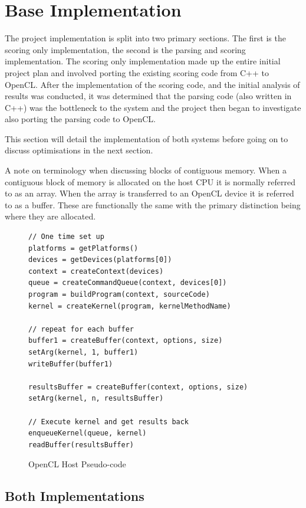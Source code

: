 \section{Base Implementation}

The project implementation is split into two primary sections. The first is the
scoring only implementation, the second is the parsing and scoring
implementation. The scoring only implementation made up the entire initial
project plan and involved porting the existing scoring code from C++ to OpenCL.
After the implementation of the scoring code, and the initial analysis of
results was conducted, it was determined that the parsing code (also written in
C++) was the bottleneck to the system and the project then began to investigate
also porting the parsing code to OpenCL.

This section will detail the implementation of both systems before going on to
discuss optimisations in the next section.

A note on terminology when discussing blocks of contiguous memory. When a
contiguous block of memory is allocated on the host CPU it is normally referred
to as an array. When the array is transferred to an OpenCL device it is referred
to as a buffer. These are functionally the same with the primary distinction
being where they are allocated.

\begin{figure}[H]
\small\begin{verbatim}
// One time set up
platforms = getPlatforms()
devices = getDevices(platforms[0])
context = createContext(devices)
queue = createCommandQueue(context, devices[0])
program = buildProgram(context, sourceCode)
kernel = createKernel(program, kernelMethodName)

// repeat for each buffer
buffer1 = createBuffer(context, options, size)
setArg(kernel, 1, buffer1)
writeBuffer(buffer1)

resultsBuffer = createBuffer(context, options, size)
setArg(kernel, n, resultsBuffer)

// Execute kernel and get results back
enqueueKernel(queue, kernel)
readBuffer(resultsBuffer)
\end{verbatim}
\caption{OpenCL Host Pseudo-code}
\label{fig:openCLPseudocode}
\end{figure}

\subsection{Both Implementations}

